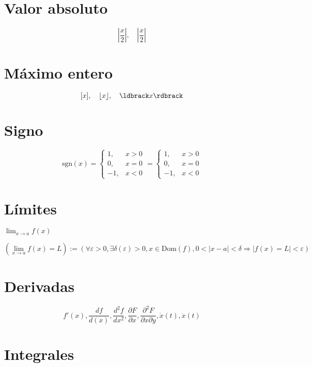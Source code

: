 \documentclass[a4paper, 11pt]{article}
\begin{document}
     \section{Valor absoluto}
       $$\left|\frac{x}{2}\right|, \quad \left\vert\frac{x}{2}\right\vert$$
     
     \section{Máximo entero}
       $$[x], \quad \lfloor x\rfloor, \quad \ldbrack x\rdbrack $$
     
     \section{Signo}
       $$\text{sgn}(x) = \begin{cases}
                           1, & x > 0 \\
                           0, & x = 0\\
                           -1, & x < 0
                         \end{cases} = \left\{ \begin{array}{rc}
                                                    1, & x > 0 \\
                                                    0, & x = 0\\
                                                    -1, & x < 0 
                                             \end{array}\right.$$
     
     \section{Límites}
     $\lim_{x \to a} f(x)$ \lipsum[5]
     
       $$\left(\lim_{x \to a} f(x) = L\right) := \left( \forall \varepsilon  > 0, \exists\delta(\varepsilon) > 0, x \in \text{Dom}(f), 0 < | x - a| < \delta \Rightarrow |f(x) = L| < \varepsilon \right)$$
       
     \section{Derivadas}
     
         $$ f'(x), \frac{df}{d(x)}, \frac{d^2f}{dx^2}, \frac{\partial F}{\partial x}, \frac{\partial ^2F}{\partial x\partial y}, \dot{x}(t), \ddot{x}(t) $$
     
     \section{Integrales}
     
\end{document}
